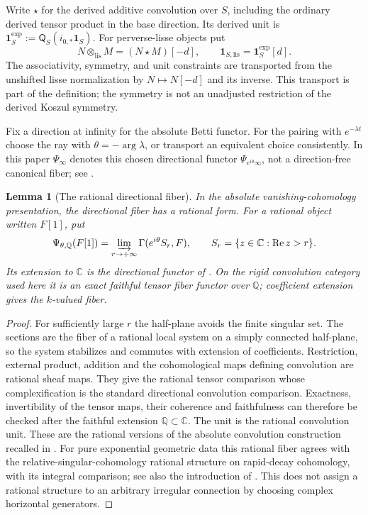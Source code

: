 \documentclass[11pt]{article}
\numberwithin{equation}{section}
\newtheorem{lemma}[lemma]{Lemma}
\theoremstyle{definition}
\theoremstyle{remark}
\newcommand{\Q}{\mathbb Q}
\newcommand{\C}{\mathbb C}
\newcommand{\lis}{\mathrm{lis}}
\newcommand{\one}{\mathbf1}
\begin{document}
Write $\star$ for the derived additive convolution over $S$, including the
ordinary derived tensor product in the base direction. Its derived unit is
$\one_S^{\exp}:=\mathsf Q_S(i_{0,*}\one_S)$. For perverse-lisse objects put
\begin{equation}\label{eq:lisse-tensor}
  N\otimes_{\lis}M=(N\star M)[-d],\qquad
  \one_{S,\lis}=\one_S^{\exp}[d].
\end{equation}
The associativity, symmetry, and unit constraints are transported from the
unshifted lisse normalization by $N\mapsto N[-d]$ and its inverse.
This transport is part of the definition; the symmetry is not an
unadjusted restriction of the derived Koszul symmetry.

Fix a direction at infinity for the absolute Betti functor. For the
pairing with $e^{-\lambda t}$ choose the ray with
$\theta=-\arg\lambda$, or transport an equivalent choice consistently.
In this paper $\Psi_\infty$ denotes this chosen directional functor
$\Psi_{e^{i\theta}\infty}$, not a direction-free canonical fiber; see
\cite[Definition~3.5 and Theorem~3.6]{Snodgrass}.


\begin{lemma}[The rational directional fiber]\label{lem:rational-directional-fiber}
In the absolute vanishing-cohomology presentation, the directional fiber
has a rational form. For a rational object written $F[1]$, put
\[
 \Psi_{\theta,\Q}(F[1])
   =\varinjlim_{r\to+\infty}\Gamma(e^{i\theta}S_r,F),
 \qquad S_r=\{z\in\C:\operatorname{Re}z>r\}.
\]
Its extension to $\C$ is the directional functor of
\cite[Definition~3.5 and Theorem~3.6]{Snodgrass}. On the rigid
convolution category used here it is an exact faithful tensor fiber
functor over $\Q$; coefficient extension gives the $k$-valued fiber.
\end{lemma}
\begin{proof}
For sufficiently large $r$ the half-plane avoids the finite singular
set. The sections are the fiber of a rational local system on a simply
connected half-plane, so the system stabilizes and commutes with
extension of coefficients. Restriction, external product, addition and
the cohomological maps defining convolution are rational sheaf maps.
They give the rational tensor comparison whose complexification is the
standard directional convolution comparison. Exactness, invertibility
of the tensor maps, their coherence and faithfulness can therefore be
checked after the faithful extension $\Q\subset\C$. The unit is the
rational convolution unit. These are the rational versions of the
absolute convolution construction recalled in \cite[\S3]{Snodgrass}.
For pure exponential geometric data this rational fiber agrees with the
relative-singular-cohomology rational structure on rapid-decay
cohomology, with its integral comparison; see also the introduction of
\cite{Snodgrass}. This does not assign a rational structure to an
arbitrary irregular connection by choosing complex horizontal generators.
\end{proof}
\end{document}

